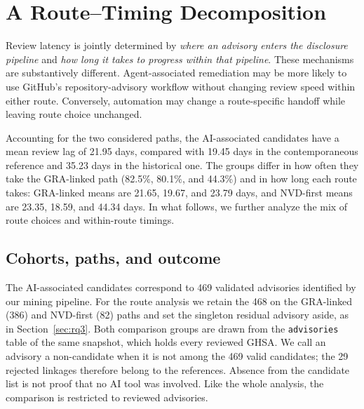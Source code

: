 \documentclass[smallextended,natbib]{svjour3}
\begin{document}
\section{A Route--Timing Decomposition}
\label{sec:model}


Review latency is jointly determined by \emph{where an advisory enters the
disclosure pipeline} and \emph{how long it takes to progress within that
pipeline}.  These mechanisms are substantively different.  Agent-associated
remediation may be more likely to use GitHub's repository-advisory workflow
without changing review speed within either route.  Conversely, automation may
change a route-specific handoff while leaving route choice unchanged.  %

Accounting for  the two considered paths, the
AI-associated candidates have a mean review lag of 21.95 days, compared with
19.45 days in the contemporaneous reference and 35.23 days in the historical
one.  The groups differ in how often they take the GRA-linked path (82.5\%,
80.1\%, and 44.3\%) and in how long each route takes: GRA-linked means are
21.65, 19.67, and 23.79 days, and NVD-first means are 23.35, 18.59, and 44.34
days. In what follows, we further analyze the  mix of route choices and   within-route timings.


\subsection{Cohorts, paths, and outcome}
\label{sec:paths}

The AI-associated candidates correspond to  469 validated advisories identified by our
mining pipeline.  For the route analysis we retain the 468 on the GRA-linked
(386) and NVD-first (82) paths and set the singleton residual advisory aside,
as in Section~\ref{sec:rq3}.  Both comparison groups are drawn from the
\texttt{advisories} table of the same snapshot, which holds every reviewed
GHSA. %
We call an advisory a non-candidate when it is not among the 469 valid
candidates; the 29 rejected linkages therefore belong to the references.
Absence from the candidate list is not proof that no AI tool was involved.
Like the whole analysis, the comparison is restricted to reviewed  advisories. %
\end{document}
